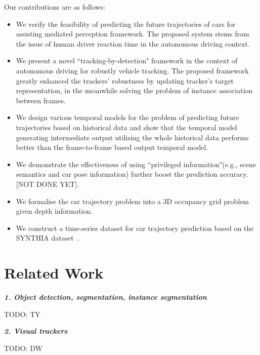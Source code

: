 \documentclass[10pt,twocolumn,letterpaper]{article}
\begin{document}
Our contributions are as follows:
\begin{itemize}

\item We verify the feasibility of predicting the future trajectories of cars for assisting mediated perception framework. The proposed system stems from the issue of human driver reaction time in the autonomous driving context.

\item We present a novel ``tracking-by-detection" framework in the context of autonomous driving for robustly vehicle tracking. The proposed framework greatly enhanced the trackers' robustness by updating tracker's target representation, in the meanwhile solving the problem of instance association between frames.

\item We design various temporal models for the problem of predicting future trajectories based on historical data and show that the temporal model generating intermediate output utilising the whole historical data performs better than the frame-to-frame based output temporal model.

\item We demonstrate the effectiveness of using ``privileged information"(e.g., scene semantics and car pose information) further boost the prediction accuracy. [NOT DONE YET].

\item We formalise the car trajectory problem into a 3D occupancy grid problem given depth information.

\item We construct a time-series dataset for car trajectory prediction based on the SYNTHIA dataset~\cite{ros2016synthia}.

\end{itemize}


\section{Related Work}

\textbf{\emph{1. Object detection, segmentation, instance segmentation}}

TODO: TY

\textbf{\emph{2. Visual trackers}}

TODO: DW
\end{document}
